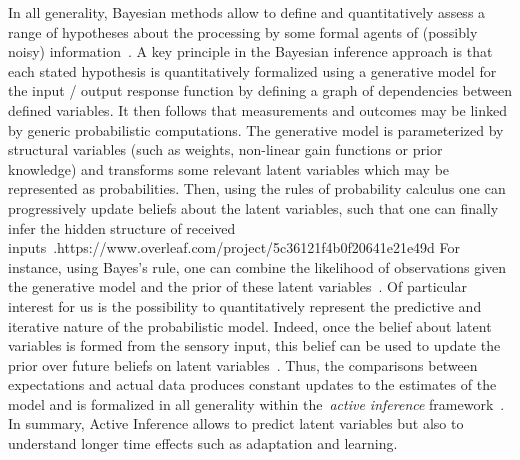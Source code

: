 \documentclass[12pt,english]{article}%
\newcommand{\citep}[1]{\parencite{#1}}
\begin{document}
In all generality, Bayesian methods allow to define and quantitatively assess
a range of hypotheses about the processing by some formal agents
of (possibly noisy) information~\citep{Deneve1999, Diaconescu2014, Daunizeau10a}.
A key principle in the Bayesian inference approach is
that each stated hypothesis is quantitatively formalized
using a generative model for the input / output response function
by defining a graph of dependencies between defined variables.
It then follows that measurements and outcomes may be linked by
generic probabilistic computations.
The generative model is parameterized by structural variables
(such as weights, non-linear gain functions or prior knowledge)
and transforms some relevant latent variables
which may be represented as probabilities.
Then, using the rules of probability calculus
one can progressively update beliefs about the latent variables,
such that one can finally infer the hidden structure of received inputs~\citep{Hoyer2003, Ma2014}.https://www.overleaf.com/project/5c36121f4b0f20641e21e49d
For instance, using Bayes's rule, one can combine
the likelihood of observations given the generative model and
the prior of these latent variables~\citep{Janes2014}.
Of particular interest for us is the possibility to
quantitatively represent
the predictive and iterative nature of the probabilistic model.
Indeed, once the belief about latent variables
is formed from the sensory input,
this belief can be used to update
the prior over future beliefs on latent variables~\citep{Montagnini2007}.
Thus, the comparisons between expectations and actual data produces
constant updates to the estimates of the model and
is formalized in all generality within the~\textit{active inference} framework~\citep{Friston2003, Friston2010}.
In summary, Active Inference allows to predict latent variables
but also to understand longer time effects such as adaptation and learning.
\end{document}
